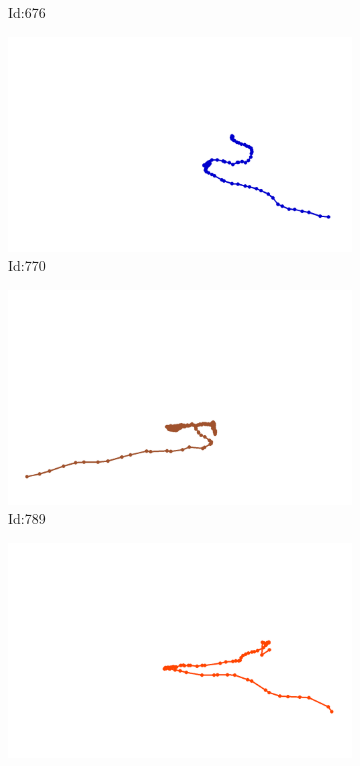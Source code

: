 \documentclass[12pt,twoside]{report}
\begin{document}
\begin{figure}
\begin{subfigure}[b]{0.20\textwidth}
\caption{Id:676}
\end{subfigure}
\begin{subfigure}[b]{0.20\textwidth}
\centering
\includegraphics[width=\textwidth]{../trajectories/770.png}
\caption{Id:770}
\end{subfigure}
\begin{subfigure}[b]{0.20\textwidth}
\centering
\includegraphics[width=\textwidth]{../trajectories/789.png}
\caption{Id:789}
\end{subfigure}
\begin{subfigure}[b]{0.20\textwidth}
\centering
\includegraphics[width=\textwidth]{../trajectories/793.png}

\end{subfigure}
\end{figure}
\end{document}
